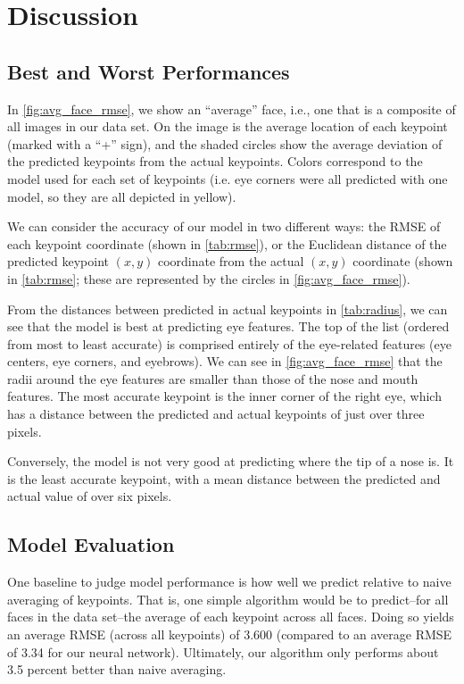 \documentclass[journal]{IEEEtran}
\begin{document}
\section{Discussion}

\subsection{Best and Worst Performances}

In \cref{fig:avg_face_rmse}, we show an ``average'' face, i.e., one that is a composite of all images in our data set. On the image is the average location of each keypoint (marked with a ``+'' sign), and the shaded circles show the average deviation of the predicted keypoints from the actual keypoints. Colors correspond to the model used for each set of keypoints (i.e. eye corners were all predicted with one model, so they are all depicted in yellow).

We can consider the accuracy of our model in two different ways: the RMSE of each keypoint coordinate (shown in \cref{tab:rmse}), or the Euclidean distance of the predicted keypoint $(x,y)$ coordinate from the actual $(x,y)$ coordinate (shown in \cref{tab:rmse}; these are represented by the circles in \cref{fig:avg_face_rmse}). 

From the distances between predicted in actual keypoints in \cref{tab:radius}, we can see that the model is best at predicting eye features. The top of the list (ordered from most to least accurate) is comprised entirely of the eye-related features (eye centers, eye corners, and eyebrows). We can see in \cref{fig:avg_face_rmse} that the radii around the eye features are smaller than those of the nose and mouth features. The most accurate keypoint is the inner corner of the right eye, which has a distance between the predicted and actual keypoints of just over three pixels.

Conversely, the model is not very good at predicting where the tip of a nose is. It is the least accurate keypoint, with a mean distance between the predicted and actual value of over six pixels.




\subsection{Model Evaluation}

One baseline to judge model performance is how well we predict relative to naive averaging of keypoints. That is, one simple algorithm would be to predict--for all faces in the data set--the average of each keypoint across all faces. Doing so yields an average RMSE (across all keypoints) of 3.600 (compared to an average RMSE of 3.34 for our neural network). Ultimately, our algorithm only performs about 3.5 percent better than naive averaging.
\end{document}
